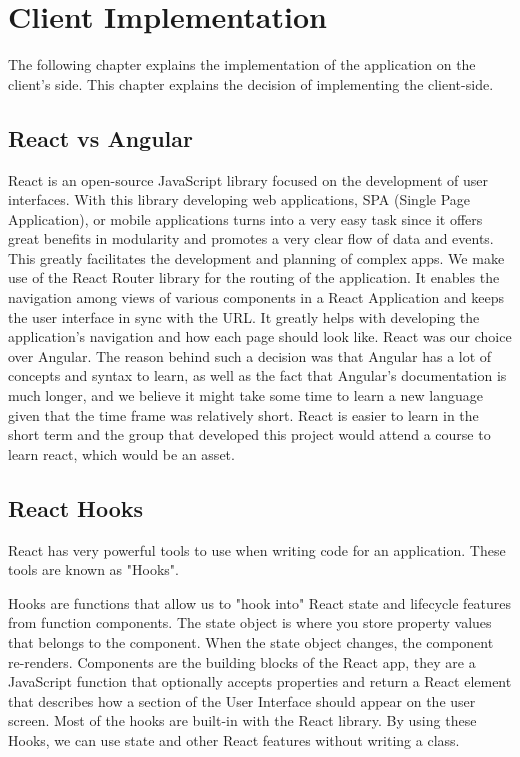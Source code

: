 \documentclass[a4paper,twoside,10pt]{report}
\begin{document}
\chapter{Client Implementation}
The following chapter explains the implementation of the application on the client’s side. This chapter explains the decision of implementing the client-side. 
 
\section{React vs Angular}

React is an open-source JavaScript library focused on the development of user interfaces. With this library developing web applications, SPA (Single Page Application), or mobile applications turns into a very easy task since it offers great benefits in modularity and promotes a very clear flow of data and events. This greatly facilitates the development and planning of complex apps.
We make use of the React Router library for the routing of the application. It enables the navigation among views of various components in a React Application and keeps the user interface in sync with the URL. It greatly helps with developing the application's navigation and how each page should look like.
React was our choice over Angular. The reason behind such a decision was that Angular has a lot of concepts and syntax to learn, as well as the fact that Angular's documentation is much longer, and we believe it might take some time to learn a new language given that the time frame was relatively short. React is easier to learn in the short term and the group that developed this project would attend a course to learn react, which would be an asset.

\section{React Hooks}
React has very powerful tools to use when writing code for an application. These tools are known as "Hooks".

Hooks are functions that allow us to "hook into" React state and lifecycle features from function components. The state object is where you store property values that belongs to the component. When the state object changes, the component re-renders. Components are the building blocks of the React app, they are a JavaScript function that optionally accepts properties and return a React element that describes how a section of the User Interface should appear on the user screen.  
Most of the hooks are built-in with the React library. By using these Hooks, we can use state and other React features without writing a class.
\end{document}

